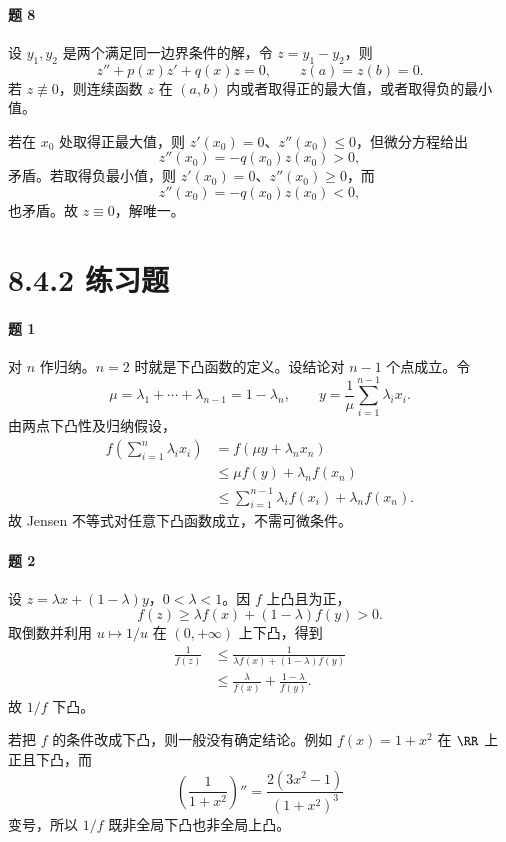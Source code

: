 \paragraph{题 8}
\begin{xsolution}
设 $y_1,y_2$ 是两个满足同一边界条件的解，令 $z=y_1-y_2$，则
\[
  z''+p(x)z'+q(x)z=0,
  \qquad z(a)=z(b)=0.
\]
若 $z\not\equiv0$，则连续函数 $z$ 在 $(a,b)$ 内或者取得正的最大值，或者取得负的最小值。

若在 $x_0$ 处取得正最大值，则 $z'(x_0)=0$、$z''(x_0)\le0$，但微分方程给出
\[
  z''(x_0)=-q(x_0)z(x_0)>0,
\]
矛盾。若取得负最小值，则 $z'(x_0)=0$、$z''(x_0)\ge0$，而
\[
  z''(x_0)=-q(x_0)z(x_0)<0,
\]
也矛盾。故 $z\equiv0$，解唯一。
\end{xsolution}

\section*{8.4.2 练习题}

\paragraph{题 1}
\begin{xsolution}
对 $n$ 作归纳。$n=2$ 时就是下凸函数的定义。设结论对 $n-1$ 个点成立。令
\[
  \mu=\lambda_1+\cdots+\lambda_{n-1}=1-\lambda_n,
  \qquad
  y=\frac1\mu\sum_{i=1}^{n-1}\lambda_i x_i.
\]
由两点下凸性及归纳假设，
\begin{align*}
  f\left(\sum_{i=1}^n\lambda_i x_i\right)
  &=f(\mu y+\lambda_nx_n)\\
  &\le \mu f(y)+\lambda_nf(x_n)\\
  &\le \sum_{i=1}^{n-1}\lambda_i f(x_i)+\lambda_nf(x_n).
\end{align*}
故 Jensen 不等式对任意下凸函数成立，不需可微条件。
\end{xsolution}

\paragraph{题 2}
\begin{xsolution}
设 $z=\lambda x+(1-\lambda)y$，$0<\lambda<1$。因 $f$ 上凸且为正，
\[
  f(z)\ge \lambda f(x)+(1-\lambda)f(y)>0.
\]
取倒数并利用 $u\mapsto1/u$ 在 $(0,+\infty)$ 上下凸，得到
\begin{align*}
  \frac1{f(z)}
  &\le\frac1{\lambda f(x)+(1-\lambda)f(y)}\\
  &\le\frac\lambda{f(x)}+\frac{1-\lambda}{f(y)}.
\end{align*}
故 $1/f$ 下凸。

若把 $f$ 的条件改成下凸，则一般没有确定结论。例如 $f(x)=1+x^2$ 在 $\RR$ 上正且下凸，而
\[
  \left(\frac1{1+x^2}\right)''
  =\frac{2(3x^2-1)}{(1+x^2)^3}
\]
变号，所以 $1/f$ 既非全局下凸也非全局上凸。
\end{xsolution}

